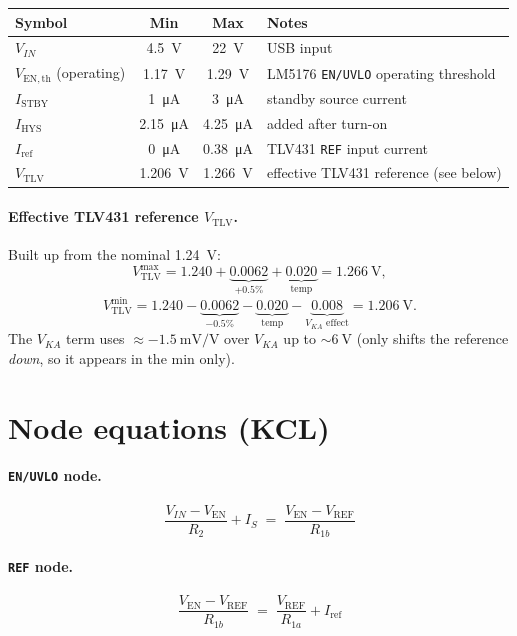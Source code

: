 \documentclass[11pt]{article}
\newcommand{\Ven}{V_{\mathrm{EN}}}
\newcommand{\Vref}{V_{\mathrm{REF}}}
\newcommand{\Vtlv}{V_{\mathrm{TLV}}}
\newcommand{\Vth}{V_{\mathrm{EN,th}}}
\newcommand{\Iref}{I_{\mathrm{ref}}}
\newcommand{\Istby}{I_{\mathrm{STBY}}}
\newcommand{\Ihys}{I_{\mathrm{HYS}}}
\newcommand{\Rone}{R_{1a}}
\newcommand{\Rtwo}{R_{1b}}
\newcommand{\Rt}{R_{2}}
\begin{document}
\begin{center}
\begin{tabular}{lccl}
\toprule
Symbol & Min & Max & Notes \\
\midrule
$V_{IN}$            & \SI{4.5}{\volt}  & \SI{22}{\volt}   & USB input \\
$\Vth$ (operating)  & \SI{1.17}{\volt} & \SI{1.29}{\volt} & LM5176 \texttt{EN/UVLO} operating threshold \\
$\Istby$            & \SI{1}{\micro\ampere}    & \SI{3}{\micro\ampere}    & standby source current \\
$\Ihys$             & \SI{2.15}{\micro\ampere} & \SI{4.25}{\micro\ampere} & added after turn-on \\
$\Iref$             & \SI{0}{\micro\ampere}    & \SI{0.38}{\micro\ampere} & TLV431 \texttt{REF} input current \\
$\Vtlv$             & \SI{1.206}{\volt}& \SI{1.266}{\volt}& effective TLV431 reference (see below) \\
\bottomrule
\end{tabular}
\end{center}

\paragraph{Effective TLV431 reference $\Vtlv$.}
Built up from the nominal \SI{1.24}{\volt}:
\[
\Vtlv^{\max}=1.240+\underbrace{0.0062}_{+0.5\%}+\underbrace{0.020}_{\text{temp}}=\SI{1.266}{\volt},
\]
\[
\Vtlv^{\min}=1.240-\underbrace{0.0062}_{-0.5\%}-\underbrace{0.020}_{\text{temp}}-\underbrace{0.008}_{V_{KA}\text{ effect}}=\SI{1.206}{\volt}.
\]
The $V_{KA}$ term uses $\approx\SI{-1.5}{\milli\volt\per\volt}$ over $V_{KA}$ up to
$\sim\!\SI{6}{\volt}$ (only shifts the reference \emph{down}, so it appears in the min only).

\section{Node equations (KCL)}

\paragraph{\texttt{EN/UVLO} node.}
\begin{equation}
\frac{V_{IN}-\Ven}{\Rt}+I_S \;=\; \frac{\Ven-\Vref}{\Rtwo}
\label{eq:kcl_en}
\end{equation}

\paragraph{\texttt{REF} node.}
\begin{equation}
\frac{\Ven-\Vref}{\Rtwo} \;=\; \frac{\Vref}{\Rone}+\Iref
\label{eq:kcl_ref}
\end{equation}
\end{document}

